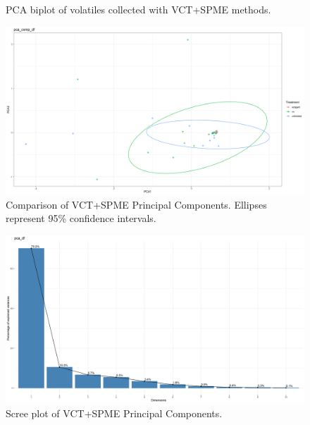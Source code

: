 \documentclass[12pt,final,CPage]{ufthesis}
\begin{document}
{\begin{figure}
{  }

  \caption{PCA biplot of volatiles collected with VCT+SPME methods.}\label{fig:all-vocs}
  \end{figure}
  \begin{figure}

  {\centering \includegraphics[width=1\linewidth]{figure/rrv_volatiles_comparison_pca_comp_df} 

  }

  \caption{Comparison of VCT+SPME Principal Components. Ellipses represent 95\% confidence intervals.}\label{fig:all-vocs-compares}
  \end{figure}
  \begin{figure}

  {\centering \includegraphics[width=1\linewidth]{figure/rrv_volatiles_screeplot_pca_df} 

  }

  \caption{Scree plot of VCT+SPME Principal Components.}\label{fig:all-vocs-scree}
  \end{figure}
  \begin{figure}


\end{figure}}
\end{document}
